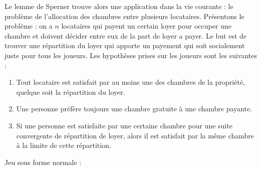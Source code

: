 \documentclass[12pt,twoside,a4paper]{article}
\begin{document}
Le lemme de Sperner trouve alors une application dans la vie courante : le probl\`eme de l'allocation des chambres entre plusieurs locataires. Pr\'esentons le probl\`eme : on a $n$ locataires qui payent un certain loyer pour occuper une chambre et doivent d\'ecider entre eux de la part de loyer \? a payer. Le but est de trouver une r\'epartition du loyer qui apporte un payement qui soit socialement juste pour tous les joueurs.
Les hypothèses prises sur les joueurs sont les suivantes :
\begin{enumerate}
	\item Tout locataire est satisfait par au moins une des chambres de la propri\'et\'e, quelque soit la r\'epartition du loyer.
	\item Une personne pr\'ef\`ere toujours une chambre gratuite \`a une chambre payante.
	\item Si une personne est satisfaite par une certaine chambre pour une suite convergente de r\'epartition de loyer, alors il est satisfait par la m\^{e}me chambre \`a la limite de cette r\'epartition.
\end{enumerate}

Jeu sous forme normale :
\end{document}
